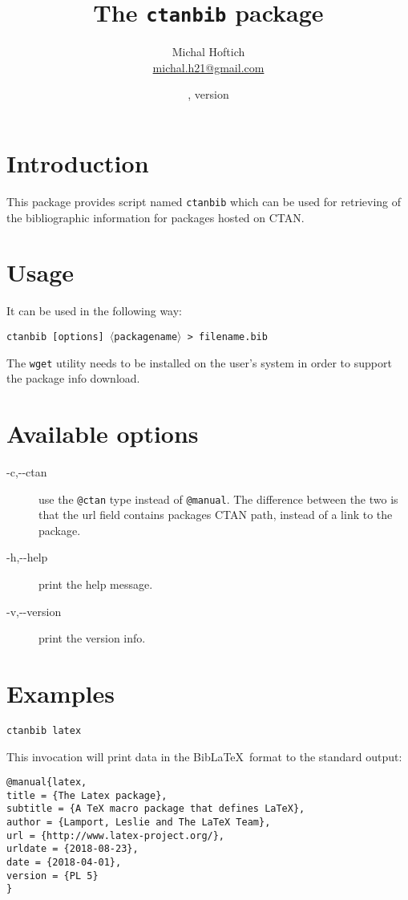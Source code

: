 \documentclass{ltxdoc}
\title{The \texttt{ctanbib} package}
\author{Michal Hoftich\\\url{michal.h21@gmail.com}}
\date{\gitdate, version \gitversion}
\newcommand\package[1]{\texttt{#1}}
\begin{document}
\maketitle

\section{Introduction}
This package provides script named \package{ctanbib} which can be used for retrieving of the bibliographic information for packages hosted on CTAN.


\section{Usage}


It can be used in the following way:


\noindent\package{ctanbib [options]  $\langle$packagename$\rangle$ > filename.bib}

The \texttt{wget} utility needs to be installed on the user's system in order to support the package info download.


\section{Available options}

\begin{description}
  \item[-c,-\/-ctan] use the \texttt{@ctan} type instead of \texttt{@manual}.
    The difference between the two is that the url field contains packages CTAN
    path, instead of a link to the package.
  \item[-h,-\/-help] print the help message.
  \item[-v,-\/-version] print the version info.
\end{description}


\section{Examples}

\begin{verbatim}
ctanbib latex  
\end{verbatim}


\noindent This invocation will print data in the Bib\LaTeX\ format to the standard output:

\begin{verbatim}
@manual{latex,
title = {The Latex package},
subtitle = {A TeX macro package that defines LaTeX},
author = {Lamport, Leslie and The LaTeX Team},
url = {http://www.latex-project.org/},
urldate = {2018-08-23}, 
date = {2018-04-01},
version = {PL 5}
}
\end{verbatim}
\end{document}
